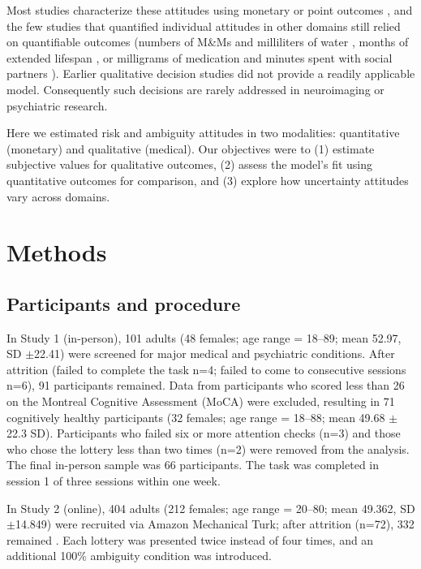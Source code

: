 \documentclass[11pt]{article}
\begin{document}
Most studies characterize these attitudes using monetary or point outcomes \cite{levy2010neural,tymula2012adolescents,tymula2013aging,grubb2016neural,korn2020decisionmaking}, and the few studies that quantified individual attitudes in other domains still relied on quantifiable outcomes (numbers of M\&Ms and milliliters of water \cite{rosati2013capuchin}, months of extended lifespan \cite{tymula2023exchanging}, or milligrams of medication and minutes spent with social partners \cite{tymula2020social}). Earlier qualitative decision studies \cite{simon1955behavioral,march1987decision} did not provide a readily applicable model. Consequently such decisions are rarely addressed in neuroimaging or psychiatric research.

Here we estimated risk and ambiguity attitudes in two modalities: quantitative (monetary) and qualitative (medical). Our objectives were to (1) estimate subjective values for qualitative outcomes, (2) assess the model's fit using quantitative outcomes for comparison, and (3) explore how uncertainty attitudes vary across domains.

\section{Methods}
\subsection{Participants and procedure}
In Study 1 (in-person), 101 adults (48 females; age range = 18--89; mean 52.97, SD $\pm$22.41) were screened for major medical and psychiatric conditions. After attrition (failed to complete the task n=4; failed to come to consecutive sessions n=6), 91 participants remained. Data from participants who scored less than 26 on the Montreal Cognitive Assessment (MoCA) \cite{nasreddine2005moca,carson2018moca} were excluded, resulting in 71 cognitively healthy participants (32 females; age range = 18--88; mean 49.68 $\pm$22.3 SD). Participants who failed six or more attention checks (n=3) and those who chose the lottery less than two times (n=2) were removed from the analysis. The final in-person sample was 66 participants. The task was completed in session 1 of three sessions within one week.

In Study 2 (online), 404 adults (212 females; age range = 20--80; mean 49.362, SD $\pm$14.849) were recruited via Amazon Mechanical Turk; after attrition (n=72), 332 remained \cite{xu2021ambiguity}. Each lottery was presented twice instead of four times, and an additional 100\% ambiguity condition was introduced.
\end{document}
